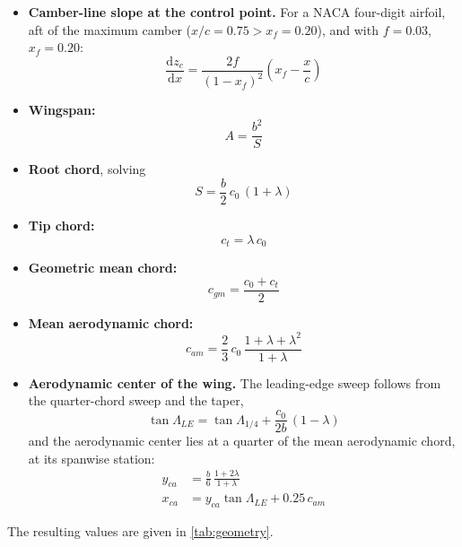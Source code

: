 \documentclass[11pt,letterpaper]{article}
\newcommand{\dd}{\mathrm{d}}
\begin{document}
\begin{itemize}
  \item \textbf{Camber-line slope at the control point.} For a NACA four-digit airfoil, aft of the
  maximum camber ($x/c = 0.75 > x_f = 0.20$), and with $f = 0.03$, $x_f = 0.20$:
  \begin{equation}
    \frac{\dd z_c}{\dd x} = \frac{2f}{(1-x_f)^2}\left(x_f - \frac{x}{c}\right)
    \label{eq:camber}
  \end{equation}
  \item \textbf{Wingspan:}
  \begin{equation}
    A = \frac{b^2}{S}
  \end{equation}
  \item \textbf{Root chord}, solving
  \begin{equation}
    S = \frac{b}{2}\, c_0 \,(1+\lambda)
  \end{equation}
  \item \textbf{Tip chord:}
  \begin{equation}
    c_t = \lambda\, c_0
  \end{equation}
  \item \textbf{Geometric mean chord:}
  \begin{equation}
    c_{gm} = \frac{c_0 + c_t}{2}
  \end{equation}
  \item \textbf{Mean aerodynamic chord:}
  \begin{equation}
    c_{am} = \frac{2}{3}\, c_0\, \frac{1+\lambda+\lambda^2}{1+\lambda}
  \end{equation}
  \item \textbf{Aerodynamic center of the wing.} The leading-edge sweep follows from the
  quarter-chord sweep and the taper,
  \begin{equation}
    \tan\Lambda_{LE} = \tan\Lambda_{1/4} + \frac{c_0}{2b}\,(1-\lambda)
    \label{eq:sweep}
  \end{equation}
  and the aerodynamic center lies at a quarter of the mean aerodynamic chord, at its spanwise station:
  \begin{align}
    y_{ca} &= \frac{b}{6}\,\frac{1+2\lambda}{1+\lambda} \\
    x_{ca} &= y_{ca}\tan\Lambda_{LE} + 0.25\, c_{am}
  \end{align}
\end{itemize}

The resulting values are given in \cref{tab:geometry}.
\end{document}
